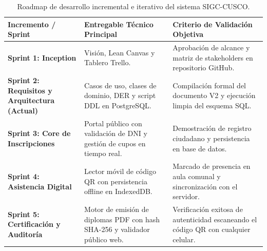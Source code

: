 \documentclass[11pt,a4paper]{article}
\begin{document}
\begin{table}[H]
\centering
\small
\renewcommand{\arraystretch}{1.2}
\begin{tabularx}{\textwidth}{P{2.6cm}P{4.4cm}Y}
\toprule
\textbf{Incremento / Sprint} & \textbf{Entregable Técnico Principal} & \textbf{Criterio de Validación Objetiva} \\
\midrule
\textbf{Sprint 1: Inception} & Visión, Lean Canvas y Tablero Trello. & Aprobación de alcance y matriz de stakeholders en repositorio GitHub. \\
\midrule
\textbf{Sprint 2: Requisitos y Arquitectura (Actual)} & Casos de uso, clases de dominio, DER y script DDL en PostgreSQL. & Compilación formal del documento V2 y ejecución limpia del esquema SQL. \\
\midrule
\textbf{Sprint 3: Core de Inscripciones} & Portal público con validación de DNI y gestión de cupos en tiempo real. & Demostración de registro ciudadano y persistencia en base de datos. \\
\midrule
\textbf{Sprint 4: Asistencia Digital} & Lector móvil de código QR con persistencia offline en IndexedDB. & Marcado de presencia en aula comunal y sincronización con el servidor. \\
\midrule
\textbf{Sprint 5: Certificación y Auditoría} & Motor de emisión de diplomas PDF con hash SHA-256 y validador público web. & Verificación exitosa de autenticidad escaneando el código QR con cualquier celular. \\
\bottomrule
\end{tabularx}
\caption{Roadmap de desarrollo incremental e iterativo del sistema SIGC-CUSCO.}
\label{tab:roadmap}
\end{table}
\end{document}
